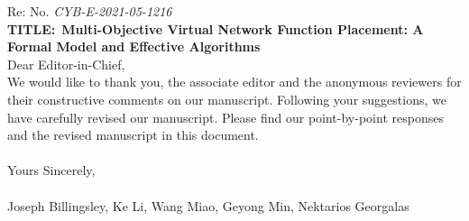 \documentclass[DIV15, a4paper]{article}
\begin{document}
\noindent Re: No. \textit{CYB-E-2021-05-1216}\\
{\textbf{TITLE:}}\ \textbf{Multi-Objective Virtual Network Function Placement: A Formal Model and Effective Algorithms}\\

\noindent Dear Editor-in-Chief,\\

We would like to thank you, the associate editor and the anonymous reviewers for their constructive comments on our manuscript. Following your suggestions, we have carefully revised our manuscript. Please find our point-by-point responses and the revised manuscript in this document.\\\\

Yours Sincerely,\\\\
Joseph Billingsley, Ke Li, Wang Miao, Geyong Min, Nektarios Georgalas
\clearpage








\end{document}
